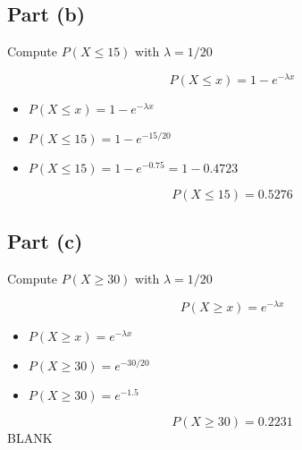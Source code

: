 \documentclass[a4paper,12pt]{article}
\begin{document}
\subsection*{Part (b)}
\noindent Compute $P(X \leq 15)$ with $\lambda = 1/20$

\[ P(X \leq x) = 1 -e^{-\lambda x} \]


\begin{itemize}
	\item $ P(X \leq x) = 1- e^{-\lambda x} $
	\item $ P(X \leq 15) = 1 - e^{-15/20}  $
	\item $ P(X \leq 15) = 1- e^{-0.75} =  1- 0.4723$

\end{itemize} 

\[ P(X \leq 15) = 0.5276\]

\subsection*{Part (c)}
\noindent Compute $P(X \geq 30)$ with $\lambda = 1/20$

\[ P(X \geq x) = e^{-\lambda x} \]


\begin{itemize}
	\item $ P(X \geq x) =  e^{-\lambda x} $
	\item $ P(X \geq 30) = e^{-30/20}  $
	\item $ P(X \geq 30) =  e^{-1.5} $

\end{itemize} 

\[ P(X \geq 30) = 0.2231\]
\newpage
BLANK
\end{document}
